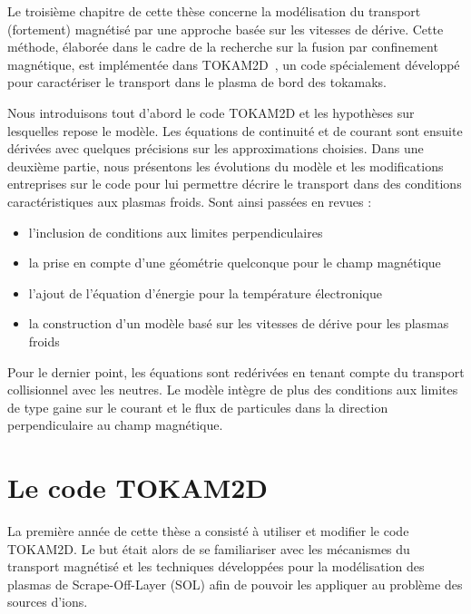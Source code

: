 \begin{refsection}
Le troisième chapitre de cette thèse concerne la modélisation du transport
(fortement) magnétisé par une approche basée sur les vitesses de dérive. Cette
méthode, élaborée dans le cadre de la recherche sur la fusion par
confinement magnétique, est implémentée dans TOKAM2D~\cite{Sarazin}, un code 
spécialement développé pour caractériser le transport dans le plasma de bord
des tokamaks.

Nous introduisons tout d'abord le code TOKAM2D et les hypothèses sur
lesquelles repose le modèle. Les équations de continuité et de
courant sont ensuite dérivées avec quelques précisions sur les approximations
choisies.
Dans une deuxième partie, nous présentons les évolutions du
modèle et les modifications entreprises sur le code pour lui
permettre décrire le transport dans des conditions caractéristiques aux plasmas
froids. Sont ainsi passées en revues :

\begin{itemize}
  \item l'inclusion de conditions aux limites
perpendiculaires
\item la prise en compte d'une géométrie quelconque pour le champ magnétique
\item l'ajout de l'équation d'énergie pour la
température électronique
\item la construction d'un modèle basé sur les vitesses de dérive pour les plasmas froids
\end{itemize}

Pour le dernier point, les équations sont redérivées en tenant
compte du transport collisionnel avec les neutres. Le modèle intègre de plus des
conditions aux limites de type gaine sur le courant et le flux de particules
dans la direction perpendiculaire au champ magnétique.



\section{Le code TOKAM2D}

La première année de cette thèse a consisté à utiliser et modifier le
code {TOKAM2D}. Le but était alors de se familiariser avec les mécanismes du
transport magnétisé et les techniques développées pour la modélisation des
plasmas de Scrape-Off-Layer (SOL) afin
de pouvoir les appliquer au problème des sources d'ions. 


\end{refsection}
